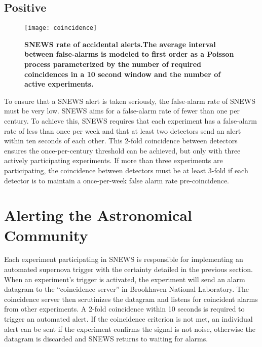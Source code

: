	\subsection*{Positive}
	\label{sec:snews_positive}

	\begin{wrapfigure}{r}{0.68\textwidth}
		\vspace{-0.9in}
		\centering
		\texttt{[image: coincidence]}
		\caption[SNEWS Rate of Accidental Alerts]{\bf SNEWS rate of accidental alerts.\rm The average interval between false-alarms is modeled to first order as a Poisson process parameterized by the number of required coincidences in a 10 second window and the number of active experiments\cite{Antonioli2004}.}
		\label{fig:coincidence}
		\vspace{0.0in}
	\end{wrapfigure}


	To ensure that a SNEWS alert is taken seriously, the false-alarm rate of SNEWS must be very low. SNEWS aims for a false-alarm rate of fewer than one per century. To achieve this, SNEWS requires that each experiment has a false-alarm rate of less than once per week and that at least two detectors send an alert within ten seconds of each other. This 2-fold coincidence between detectors ensures the once-per-century threshold can be achieved, but only with three actively participating experiments. If more than three experiments are participating, the coincidence between detectors must be at least 3-fold if each detector is to maintain a once-per-week false alarm rate pre-coincidence.


	\section{Alerting the Astronomical Community}
	Each experiment participating in SNEWS is responsible for implementing an automated supernova trigger with the certainty detailed in the previous section. When an experiment's trigger is activated, the experiment will send an alarm datagram to the ``coincidence server'' in Brookhaven National Laboratory. The coincidence server then scrutinizes the datagram and listens for coincident alarms from other experiments. A 2-fold coincidence within 10 seconds is required to trigger an automated alert. If the coincidence criterion is not met, an individual alert can be sent if the experiment confirms the signal is not noise, otherwise the datagram is discarded and SNEWS returns to waiting for alarms.

